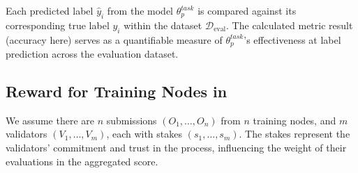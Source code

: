 \documentclass[conference]{IEEEtran}
\begin{document}
Each predicted label $\hat{y}_i$ from the model $\theta^{task}_p$ is compared against its corresponding true label $y_i$ within the dataset $\mathcal{D}_{\text{eval}}$. The calculated metric result (accuracy here) serves as a quantifiable measure of $\theta^{task}_p$'s effectiveness at label prediction across the evaluation dataset. 






\subsection{Reward for Training Nodes in \SNT}\label{sec: reward-for-training-nodes}















We assume there are $n$ submissions $(O_1, \ldots, O_n)$ from $n$ training nodes, and $m$ validators $(V_1, \ldots, V_m)$, each with stakes $(s_1, \ldots, s_m)$. The stakes represent the validators' commitment and trust in the process, influencing the weight of their evaluations in the aggregated score.
\end{document}
